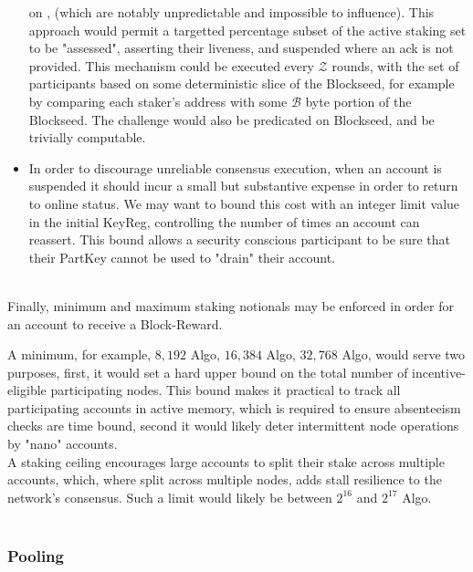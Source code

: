 \documentclass[11pt,a4paper]{article}
\begin{document}
\begin{itemize}
          on , (which are notably unpredictable and impossible to influence). This approach would 
          permit a targetted percentage subset of the active staking set to be "assessed", asserting their liveness, and
          suspended where an ack is not provided. This mechanism could be executed every \(\mathcal{Z}\) rounds, with 
          the set of participants based on some deterministic slice of the \gls{Blockseed}, for example by comparing 
          each staker's address with some \(\mathcal{B}\) byte portion of the \gls{Blockseed}. The challenge would also 
          be predicated on \gls{Blockseed}, and be trivially computable.
    \item In order to discourage unreliable consensus execution, when an account is suspended it should incur a small
          but substantive expense in order to return to online status. We may want to bound this cost with an 
          integer limit value in the initial \gls{KeyReg}, controlling the number of times an account can reassert. This
          bound allows a security conscious participant to be sure that their \gls{PartKey} cannot be used to "drain"
          their account.

\end{itemize} \mbox{} \\

Finally, minimum and maximum staking notionals may be enforced in order for an account to receive a \gls{Block-Reward}.

A minimum, for example, $8,192$ Algo, $16,384$ Algo, $32,768$ Algo, would serve two purposes, first, it would set a hard
upper bound on the total number of incentive-eligible participating nodes. This bound makes it practical to track all 
participating accounts in active memory, which is required to ensure absenteeism checks are time bound, second it would 
likely deter intermittent node operations by "nano" accounts. \\ 

A staking ceiling encourages large accounts to split their stake across multiple accounts, which, where split across
multiple nodes, adds stall resilience to the network's consensus. Such a limit would likely be between $2^{16}$ and
$2^{17}$ Algo. \\ \\

\pagebreak

\subsubsection{Pooling}
\end{document}

